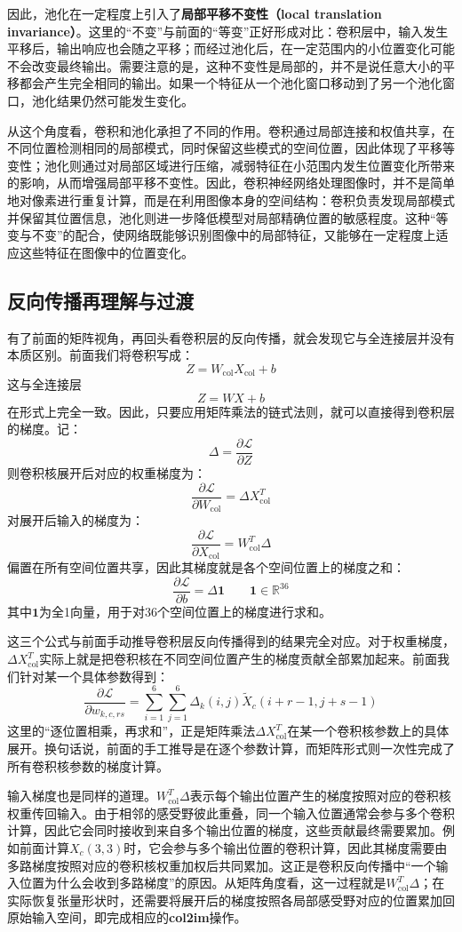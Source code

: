 因此，池化在一定程度上引入了\textbf{局部平移不变性（local translation invariance）}。这里的“不变”与前面的“等变”正好形成对比：卷积层中，输入发生平移后，输出响应也会随之平移；而经过池化后，在一定范围内的小位置变化可能不会改变最终输出。需要注意的是，这种不变性是局部的，并不是说任意大小的平移都会产生完全相同的输出。如果一个特征从一个池化窗口移动到了另一个池化窗口，池化结果仍然可能发生变化。

从这个角度看，卷积和池化承担了不同的作用。卷积通过局部连接和权值共享，在不同位置检测相同的局部模式，同时保留这些模式的空间位置，因此体现了平移等变性；池化则通过对局部区域进行压缩，减弱特征在小范围内发生位置变化所带来的影响，从而增强局部平移不变性。因此，卷积神经网络处理图像时，并不是简单地对像素进行重复计算，而是在利用图像本身的空间结构：卷积负责发现局部模式并保留其位置信息，池化则进一步降低模型对局部精确位置的敏感程度。这种“等变与不变”的配合，使网络既能够识别图像中的局部特征，又能够在一定程度上适应这些特征在图像中的位置变化。

\subsection{反向传播再理解与过渡}

有了前面的矩阵视角，再回头看卷积层的反向传播，就会发现它与全连接层并没有本质区别。前面我们将卷积写成：
$$
Z=W_{\mathrm{col}}X_{\mathrm{col}}+b
$$
这与全连接层
$$
Z=WX+b
$$
在形式上完全一致。因此，只要应用矩阵乘法的链式法则，就可以直接得到卷积层的梯度。记：
$$
\Delta=\frac{\partial\mathcal{L}}{\partial Z}
$$
则卷积核展开后对应的权重梯度为：
$$
\frac{\partial\mathcal{L}}{\partial W_{\mathrm{col}}}=\Delta X_{\mathrm{col}}^{T}
$$
对展开后输入的梯度为：
$$
\frac{\partial\mathcal{L}}{\partial X_{\mathrm{col}}}=W_{\mathrm{col}}^{T}\Delta
$$
偏置在所有空间位置共享，因此其梯度就是各个空间位置上的梯度之和：
$$
\frac{\partial\mathcal{L}}{\partial b}=\Delta\mathbf{1} \qquad \mathbf{1}\in\mathbb{R}^{36}
$$
其中$\mathbf{1}$为全1向量，用于对$36$个空间位置上的梯度进行求和。

这三个公式与前面手动推导卷积层反向传播得到的结果完全对应。对于权重梯度，$\Delta X_{\mathrm{col}}^T$实际上就是把卷积核在不同空间位置产生的梯度贡献全部累加起来。前面我们针对某一个具体参数得到：
$$
\frac{\partial\mathcal{L}}{\partial w_{k,c,rs}}=\sum_{i=1}^{6}\sum_{j=1}^{6}\Delta_k(i,j)\tilde X_c(i+r-1,j+s-1)
$$
这里的“逐位置相乘，再求和”，正是矩阵乘法$\Delta X_{\mathrm{col}}^T$在某一个卷积核参数上的具体展开。换句话说，前面的手工推导是在逐个参数计算，而矩阵形式则一次性完成了所有卷积核参数的梯度计算。

输入梯度也是同样的道理。$W_{\mathrm{col}}^T\Delta$表示每个输出位置产生的梯度按照对应的卷积核权重传回输入。由于相邻的感受野彼此重叠，同一个输入位置通常会参与多个卷积计算，因此它会同时接收到来自多个输出位置的梯度，这些贡献最终需要累加。例如前面计算$X_c(3,3)$时，它会参与多个输出位置的卷积计算，因此其梯度需要由多路梯度按照对应的卷积核权重加权后共同累加。这正是卷积反向传播中“一个输入位置为什么会收到多路梯度”的原因。从矩阵角度看，这一过程就是$W_{\mathrm{col}}^T\Delta$；在实际恢复张量形状时，还需要将展开后的梯度按照各局部感受野对应的位置累加回原始输入空间，即完成相应的\textbf{col2im}操作。

